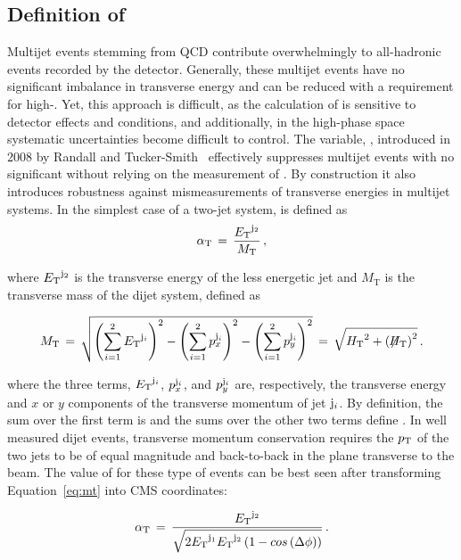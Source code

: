\subsection{Definition of \texorpdfstring{\alphat}{AlphaT}\label{sec:alphat}}

Multijet events stemming from QCD contribute overwhelmingly to
all-hadronic events recorded by the detector. Generally, these multijet events
have no significant imbalance in transverse energy and can 
be reduced with a requirement for high-\met. Yet, this approach is difficult, 
as the calculation of \met is sensitive to detector effects and conditions, 
and additionally, in the high-\met phase space systematic uncertainties become difficult
to control. The variable, \alphat, introduced in 2008 by Randall and 
Tucker-Smith~\cite{Randall:2008rw} effectively suppresses multijet 
events with no significant \met without relying on the measurement
of \met. By construction it also introduces robustness against mismeasurements 
of transverse energies in multijet systems.  In the simplest case of a two-jet system,
\alphat is defined as
\begin{equation}
\label{eq:alphat}
\alpha_{\text{T}}\, =\, \frac{{E_{\text T}}^{{\rm j}_2}}{M_\text{T}} \, ,
\end{equation}

where ${E_{\text T}}^{\rm j_2}$ is the transverse energy of the less energetic
jet and $M_\text{T}$ is the transverse mass of the dijet system,
defined as

\begin{equation}
  \label{eq:mt}
  M_\text{T}\, = \,\sqrt{ \left( \sum_{i=1}^2 {E_{\text T}}^{{\rm j}_i}
    \right)^2 - \left( \sum_{i=1}^2 p_x^{{\rm j}_i} \right)^2 - \left(
      \sum_{i=1}^2 p_y^{{\rm j}_i} \right)^2} \, = \,\sqrt{\mbox{$H_\text{T}$}^2 + \left(\mbox{$\not\!\!H_\text{T}$}\right)^2} \,  .
\end{equation}

where the three terms, ${E_{\text T}}^{{\rm j}_i}$, $p_x^{{\rm j}_i}$, and $p_y^{{\rm j}_i}$ are,
respectively, the transverse energy and $x$ or $y$ components of the
transverse momentum of jet ${\rm j}_i$. By definition, the sum over the first term is
\scalht and the sums over the other two terms define \mht. In well 
measured dijet events, transverse momentum conservation requires 
the $p_{\mathrm{T}}$ of the two jets to be of equal magnitude and back-to-back 
in the plane transverse to the beam. The value of \alphat for these 
type of events can be best seen after transforming 
Equation~\ref{eq:mt} into CMS coordinates:

\begin{equation}
  \label{eq:mt-polar}
  \alpha_{\text{T}}\, = \,\frac{{E_{\text T}}^{{\rm j}_2}}{\sqrt{2{E_{\text T}}^{{\rm j}_1}
   {E_{\text T}}^{{\rm j}_2} \left(1-cos\left(\Delta\phi\right)\right)}}\, .
\end{equation}

